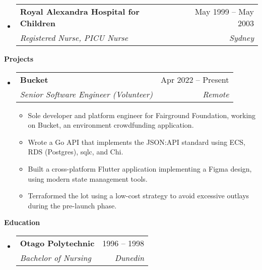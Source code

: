 \documentclass[12pt]{article}
\makeatletter
\def \entryspacing {-0em}
\renewcommand{\section}[2]{\vspace{0.5ex}
  \colorbox{secondary}{\color{white}\raggedbottom\normalsize\textbf{{#1}{\hspace{0.5em}#2}}}
}
\newcommand{\resumeEntryStart}{\begin{itemize}[leftmargin=2.5mm]}
\newcommand{\resumeEntryEnd}{\end{itemize}\vspace{\entryspacing}}
\newcommand{\resumeItemListStart}{\begin{itemize}[leftmargin=4.5mm]}
\newcommand{\resumeItemListEnd}{\end{itemize}}
\newcommand{\resumeItem}[1]{
  \item\small{
    {#1 \vspace{-0.9ex}}
  }
}
\newcommand{\resumeEntryTSDL}[4]{
  \vspace{-0.5ex}\item[]
    \begin{tabularx}{0.97\textwidth}{X@{\hspace{5em}}r}
      \textbf{\color{primary}#1} & {\firabook\color{accent}\small#2} \\
      \textit{\color{accent}\small#3} & \textit{\color{accent}\small#4} \\
    \end{tabularx}\vspace{-0.9ex}
}
\makeatother
\begin{document}
  \resumeEntryStart
    \resumeEntryTSDL
      {Royal Alexandra Hospital for Children}{May 1999 -- May 2003}
      {Registered Nurse, PICU Nurse}{Sydney}
  \resumeEntryEnd

\section{\faFlask}{Projects}

  \resumeEntryStart
    \resumeEntryTSDL
      {Bucket}{Apr 2022 -- Present}
      {Senior Software Engineer (Volunteer)}{Remote}
    \resumeItemListStart
      \resumeItem {Sole developer and platform engineer for Fairground Foundation, working on Bucket, an environment crowdfunding application.}
      \resumeItem {Wrote a Go API that implements the JSON:API standard using ECS, RDS (Postgres), sqlc, and Chi.}
      \resumeItem {Built a cross-platform Flutter application implementing a Figma design, using modern state management tools.}
      \resumeItem {Terraformed the lot using a low-cost strategy to avoid excessive outlays during the pre-launch phase.}
    \resumeItemListEnd
  \resumeEntryEnd

\section{\faGraduationCap}{Education}

  \resumeEntryStart
    \resumeEntryTSDL
      {Otago Polytechnic}{1996 -- 1998}
      {Bachelor of Nursing}{Dunedin}
  \resumeEntryEnd
\end{document}
